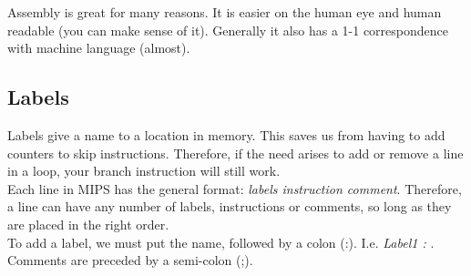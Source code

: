 \documentclass[12pt, twoside]{article}
\begin{document}
Assembly is great for many reasons.  It is easier on the human eye and human readable (you can make sense of it).  Generally it also has a 1-1 correspondence with machine language (almost). \\

\subsection{Labels}
Labels give a name to a location in memory.  This saves us from having to add counters to skip instructions.  Therefore, if the need arises to add or remove a line in a loop, your branch instruction will still work. \\

Each line in MIPS has the general format: \emph{labels instruction comment}.  Therefore, a line can have any number of labels, instructions or comments, so long as they are placed in the right order. \\

To add a label, we must put the name, followed by a colon (:).  I.e. \emph{Label1 : }.  Comments are preceded by a semi-colon (;). \\
\end{document}
